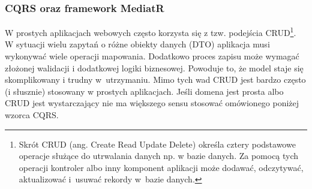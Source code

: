 
\subsubsection{CQRS oraz framework MediatR}\label{sec/lab4/cqrs}


W prostych aplikacjach webowych często korzysta się z tzw. podejścia CRUD\footnote{Skrót CRUD (ang. Create Read Update Delete) określa cztery podstawowe operacje służące do utrwalania danych np. w bazie danych. Za pomocą tych operacji kontroler albo inny komponent aplikacji może dodawać, odczytywać, aktualizować i~usuwać rekordy w~bazie danych.}. W sytuacji wielu zapytań o różne obiekty danych (DTO) aplikacja musi wykonywać wiele operacji mapowania. Dodatkowo proces zapisu może wymagać złożonej walidacji i dodatkowej logiki biznesowej. Powoduje to, że model staje się skomplikowany i trudny w~utrzymaniu. Mimo tych wad CRUD jest bardzo często (i słusznie) stosowany w prostych aplikacjach. Jeśli domena jest prosta albo CRUD jest wystarczający nie ma większego sensu stosować omówionego poniżej wzorca CQRS.
 
 
